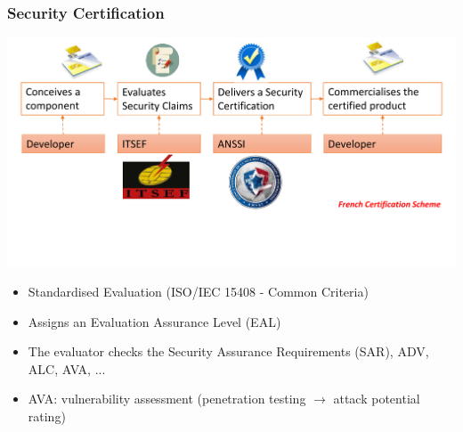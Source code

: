 \begin{frame}
\frametitle{Security Certification}
\centering
\includegraphics[width = .9\textwidth]{figures/ITSEF_nobody.pdf}
\begin{itemize}
\item Standardised Evaluation (\eg ISO/IEC 15408 - Common Criteria)
\item Assigns an Evaluation Assurance Level (EAL)
\item The evaluator checks the Security Assurance Requirements (SAR), \eg ADV, ALC, AVA, ...
\item AVA: vulnerability assessment (penetration testing $\rightarrow$ attack potential rating)
\end{itemize}
\end{frame}
%
